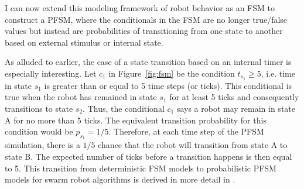 \documentclass[defaultstyle,12pt]{proposal}
\begin{document}
I can now extend this modeling framework of robot behavior as an FSM to construct a PFSM, where the conditionals in the FSM are no longer true/false values but instead are probabilities of transitioning from one state to another based on external stimulus or internal state. 

As alluded to earlier, the case of a state transition based on an internal timer is especially interesting. Let $c_1$ in Figure~\ref{fig:fsm} be the condition $t_{s_1} \geq 5$, i.e. time in state $s_1$ is greater than or equal to 5 time steps (or ticks). This conditional is true when the robot has remained in state $s_1$ for at least 5 ticks and consequently transitions to state $s_2$. Thus, the conditional $c_1$ says a robot may remain in state A for no more than 5 ticks. The equivalent transition probability for this condition would be $p_{s_1} = 1/5$. Therefore, at each time step of the PFSM simulation, there is a $1/5$ chance that the robot will transition from state A to state B. The expected number of ticks before a transition happens is then equal to 5. This transition from deterministic FSM models to probabilistic PFSM models for swarm robot algorithms is derived in more detail in \cite{Correll2007}.
\end{document}
